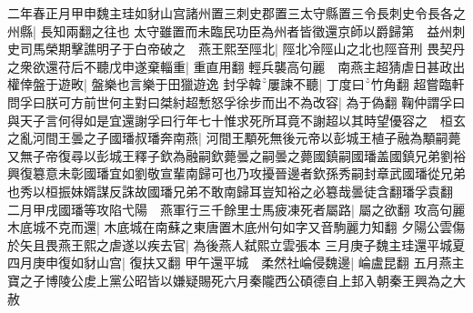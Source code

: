 二年春正月甲申魏主珪如豺山宫諸州置三刺史郡置三太守縣置三令長刺史令長各之州縣|{
	長知兩翻之往也}
太守雖置而未臨民功臣為州者皆徵還京師以爵歸第　益州刺史司馬榮期擊譙明子于白帝破之　燕王熙至陘北|{
	陘北冷陘山之北也陘音刑}
畏契丹之衆欲還苻后不聽戊申遂棄輜重|{
	重直用翻}
輕兵襲高句麗　南燕主超猜虐日甚政出權倖盤于遊畋|{
	盤樂也言樂于田獵遊逸}
封孚韓屢諫不聽|{
	丁度曰竹角翻}
超嘗臨軒問孚曰朕可方前世何主對曰桀紂超慙怒孚徐步而出不為改容|{
	為于偽翻}
鞠仲謂孚曰與天子言何得如是宜還謝孚曰行年七十惟求死所耳竟不謝超以其時望優容之　桓玄之亂河間王曇之子國璠叔璠奔南燕|{
	河間王顒死無後元帝以彭城王植子融為顒嗣薨又無子帝復尋以彭城王釋子欽為融嗣欽薨曇之嗣曇之薨國鎮嗣國璠盖國鎮兄弟劉裕興復簒意未彰國璠宜如劉敬宣輩南歸可也乃攻擾晉邊者欽孫秀嗣封章武國璠從兄弟也秀以桓振妹婿謀反誅故國璠兄弟不敢南歸耳豈知裕之必簒哉曇徒含翻璠孚袁翻}
二月甲戌國璠等攻陷弋陽　燕軍行三千餘里士馬疲凍死者屬路|{
	屬之欲翻}
攻高句麗木底城不克而還|{
	木底城在南蘇之東唐置木底州句如字又音駒麗力知翻}
夕陽公雲傷於矢且畏燕王熙之虐遂以疾去官|{
	為後燕人弑熙立雲張本}
三月庚子魏主珪還平城夏四月庚申復如豺山宫|{
	復扶又翻}
甲午還平城　柔然社崘侵魏邊|{
	崘盧昆翻}
五月燕主寶之子博陵公䖍上黨公昭皆以嫌疑賜死六月秦隴西公碩德自上邽入朝秦王興為之大赦

